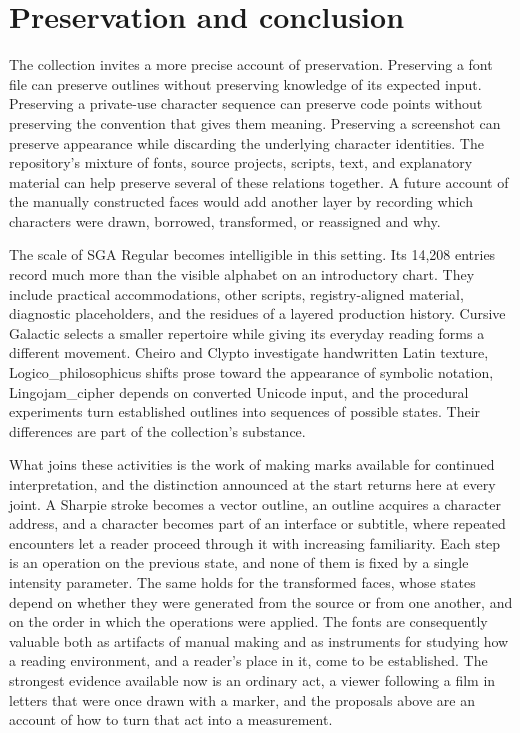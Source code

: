 \documentclass[11pt]{article}
\begin{document}
\section{Preservation and conclusion}

The collection invites a more precise account of preservation. Preserving a font file can preserve outlines without preserving knowledge of its expected input. Preserving a private-use character sequence can preserve code points without preserving the convention that gives them meaning. Preserving a screenshot can preserve appearance while discarding the underlying character identities. The repository's mixture of fonts, source projects, scripts, text, and explanatory material can help preserve several of these relations together. A future account of the manually constructed faces would add another layer by recording which characters were drawn, borrowed, transformed, or reassigned and why.

The scale of SGA Regular becomes intelligible in this setting. Its 14,208 entries record much more than the visible alphabet on an introductory chart. They include practical accommodations, other scripts, registry-aligned material, diagnostic placeholders, and the residues of a layered production history. Cursive Galactic selects a smaller repertoire while giving its everyday reading forms a different movement. Cheiro and Clypto investigate handwritten Latin texture, Logico\_philosophicus shifts prose toward the appearance of symbolic notation, Lingojam\_cipher depends on converted Unicode input, and the procedural experiments turn established outlines into sequences of possible states. Their differences are part of the collection's substance.

What joins these activities is the work of making marks available for continued interpretation, and the distinction announced at the start returns here at every joint. A Sharpie stroke becomes a vector outline, an outline acquires a character address, and a character becomes part of an interface or subtitle, where repeated encounters let a reader proceed through it with increasing familiarity. Each step is an operation on the previous state, and none of them is fixed by a single intensity parameter. The same holds for the transformed faces, whose states depend on whether they were generated from the source or from one another, and on the order in which the operations were applied. The fonts are consequently valuable both as artifacts of manual making and as instruments for studying how a reading environment, and a reader's place in it, come to be established. The strongest evidence available now is an ordinary act, a viewer following a film in letters that were once drawn with a marker, and the proposals above are an account of how to turn that act into a measurement.
\end{document}
